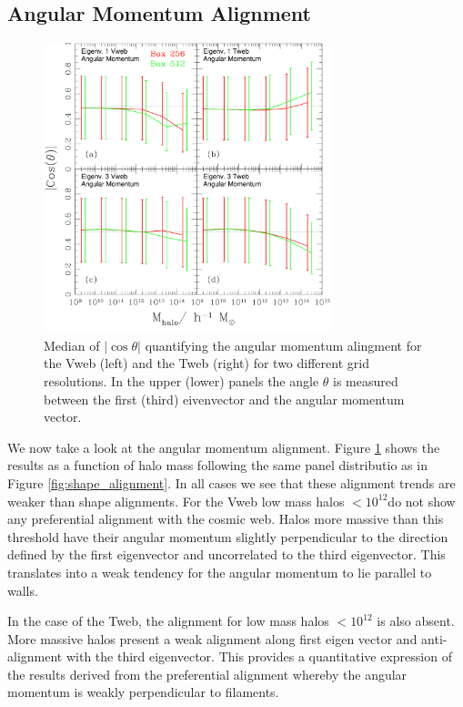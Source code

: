 \documentclass[useAMS,usenatbib]{mn2e}
\newcommand{\hMsun}{{\ifmmode{h^{-1}{\rm
        {M_{\odot}}}}\else{$h^{-1}{\rm{M_{\odot}}}$}\fi}}
\begin{document}
\subsection{Angular Momentum Alignment}

\begin{figure}
\includegraphics[width=0.75\textwidth]{Fig3.pdf}
\caption{Median of $|\cos\theta|$ quantifying the angular momentum
  alingment for the Vweb (left) and the Tweb (right) for two different
  grid resolutions. In the upper (lower) panels the angle $\theta$ is
  measured between the first (third) eivenvector and the angular
  momentum vector.\label{fig:spin_alignment}} 
\end{figure}


We now take a look at the angular momentum alignment. Figure
\ref{fig:spin_alignment} shows the results as a function of halo mass
following the same panel distributio as in Figure
\ref{fig:shape_alignment}. In all cases we see that these alignment
trends are weaker than shape alignments. For the Vweb low mass halos
$<10^{12}$\hMsun do not show any preferential alignment with the
cosmic web. Halos more massive than this threshold have their angular
momentum slightly perpendicular to the direction defined by the first
eigenvector and uncorrelated to the third eigenvector. This translates
into a weak tendency for the angular momentum to lie parallel to walls.

In the case of the Tweb, the alignment for low mass halos $<10^{12}$\hMsun 
is also absent. More massive halos present a weak alignment along
first eigen vector and anti-alignment with the third eigenvector. This
provides a quantitative expression of the results derived from the
preferential alignment whereby the angular momentum is weakly
perpendicular to filaments.
\end{document}
